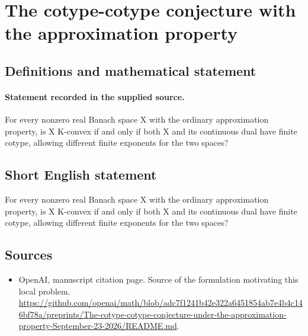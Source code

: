 \documentclass[11pt]{article}
\begin{document}
\section*{The cotype-cotype conjecture with the approximation property}\label{30007179}
\subsection{Definitions and mathematical statement}
\paragraph{Statement recorded in the supplied source.}
For every nonzero real Banach space X with the ordinary approximation property, is X K-convex if and only if both X and its continuous dual have finite cotype, allowing different finite exponents for the two spaces?
\subsection{Short English statement}
For every nonzero real Banach space X with the ordinary approximation property, is X K-convex if and only if both X and its continuous dual have finite cotype, allowing different finite exponents for the two spaces?
\subsection{Sources}
\begin{itemize}
\item[S1] OpenAI, manuscript citation page. Source of the formulation motivating this local problem.
\url{https://github.com/openai/math/blob/adc7f1241b42e322a6451854ab7e4b4c146bf78a/preprints/The-cotype-cotype-conjecture-under-the-approximation-property-September-23-2026/README.md}.
\end{itemize}
\end{document}

